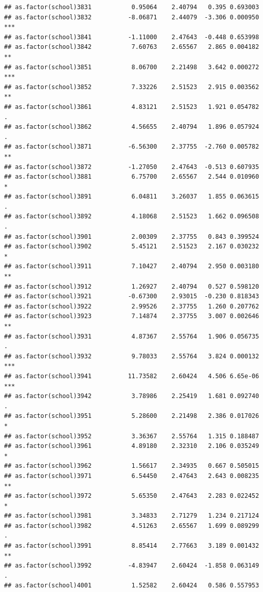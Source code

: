 \documentclass[ignorenonframetext,]{beamer}
\begin{document}
\begin{frame}[fragile]{}
\begin{verbatim}
## as.factor(school)3831           0.95064    2.40794   0.395 0.693003    
## as.factor(school)3832          -8.06871    2.44079  -3.306 0.000950 ***
## as.factor(school)3841          -1.11000    2.47643  -0.448 0.653998    
## as.factor(school)3842           7.60763    2.65567   2.865 0.004182 ** 
## as.factor(school)3851           8.06700    2.21498   3.642 0.000272 ***
## as.factor(school)3852           7.33226    2.51523   2.915 0.003562 ** 
## as.factor(school)3861           4.83121    2.51523   1.921 0.054782 .  
## as.factor(school)3862           4.56655    2.40794   1.896 0.057924 .  
## as.factor(school)3871          -6.56300    2.37755  -2.760 0.005782 ** 
## as.factor(school)3872          -1.27050    2.47643  -0.513 0.607935    
## as.factor(school)3881           6.75700    2.65567   2.544 0.010960 *  
## as.factor(school)3891           6.04811    3.26037   1.855 0.063615 .  
## as.factor(school)3892           4.18068    2.51523   1.662 0.096508 .  
## as.factor(school)3901           2.00309    2.37755   0.843 0.399524    
## as.factor(school)3902           5.45121    2.51523   2.167 0.030232 *  
## as.factor(school)3911           7.10427    2.40794   2.950 0.003180 ** 
## as.factor(school)3912           1.26927    2.40794   0.527 0.598120    
## as.factor(school)3921          -0.67300    2.93015  -0.230 0.818343    
## as.factor(school)3922           2.99526    2.37755   1.260 0.207762    
## as.factor(school)3923           7.14874    2.37755   3.007 0.002646 ** 
## as.factor(school)3931           4.87367    2.55764   1.906 0.056735 .  
## as.factor(school)3932           9.78033    2.55764   3.824 0.000132 ***
## as.factor(school)3941          11.73582    2.60424   4.506 6.65e-06 ***
## as.factor(school)3942           3.78986    2.25419   1.681 0.092740 .  
## as.factor(school)3951           5.28600    2.21498   2.386 0.017026 *  
## as.factor(school)3952           3.36367    2.55764   1.315 0.188487    
## as.factor(school)3961           4.89180    2.32310   2.106 0.035249 *  
## as.factor(school)3962           1.56617    2.34935   0.667 0.505015    
## as.factor(school)3971           6.54450    2.47643   2.643 0.008235 ** 
## as.factor(school)3972           5.65350    2.47643   2.283 0.022452 *  
## as.factor(school)3981           3.34833    2.71279   1.234 0.217124    
## as.factor(school)3982           4.51263    2.65567   1.699 0.089299 .  
## as.factor(school)3991           8.85414    2.77663   3.189 0.001432 ** 
## as.factor(school)3992          -4.83947    2.60424  -1.858 0.063149 .  
## as.factor(school)4001           1.52582    2.60424   0.586 0.557953    

\end{verbatim}
\end{frame}
\end{document}
